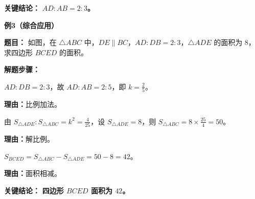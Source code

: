 \begin{examplebox}
	\textbf{\textcolor{CExample}{关键结论：}}
	\textbf{$AD:AB=2:3$。}

	\medskip
	\textbf{\textcolor{CExample}{例3（综合应用）}}

	\textbf{\textcolor{CExample}{题目：}}
	如图，在 $\triangle ABC$ 中，$DE\parallel BC$，$AD:DB=2:3$，$\triangle ADE$ 的面积为 $8$，求四边形 $BCED$ 的面积。

	\textbf{\textcolor{CExample}{解题步骤：}}
	\begin{description}[style=nextline, leftmargin=2.8em, labelsep=0.5em, itemsep=0.45em]
		\item[\textbf{第一步（求相似比）：}] $AD:DB=2:3$，故 $AD:AB=2:5$，即 $k=\frac{2}{5}$。
			\par\textbf{理由：}比例加法。
		\item[\textbf{第二步（面积比求大三角形面积）：}] 由 $S_{\triangle ADE}:S_{\triangle ABC}=k^2=\frac{4}{25}$，设 $S_{\triangle ADE}=8$，则 $S_{\triangle ABC}=8\times\frac{25}{4}=50$。
			\par\textbf{理由：}解比例。
		\item[\textbf{第三步（求四边形面积）：}] $S_{BCED}=S_{\triangle ABC}-S_{\triangle ADE}=50-8=42$。
			\par\textbf{理由：}面积相减。
	\end{description}

	\textbf{\textcolor{CExample}{关键结论：}}
	\textbf{四边形 $BCED$ 面积为 $42$。}
\end{examplebox}
